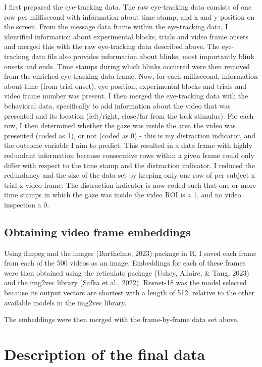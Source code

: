 \documentclass[
  man,floatsintext]{apa6}
\begin{document}
I first prepared the eye-tracking data. The raw eye-tracking data consists of one row per millisecond with information about time stamp, and x and y position on the screen. From the message data frame within the eye-tracking data, I identified information about experimental blocks, trials and video frame onsets and merged this with the raw eye-tracking data described above. The eye-tracking data file also provides information about blinks, most importantly blink onsets and ends. Time stamps during which blinks occurred were then removed from the enriched eye-tracking data frame. Now, for each millisecond, information about time (from trial onset), eye position, experimental blocks and trials and video frame number was present. I then merged the eye-tracking data with the behavioral data, specifically to add information about the video that was presented and its location (left/right, close/far from the task stimulus). For each row, I then determined whether the gaze was inside the area the video was presented (coded as 1), or not (coded as 0) - this is my distraction indicator, and the outcome variable I aim to predict. This resulted in a data frame with highly redundant information because consecutive rows within a given frame could only differ with respect to the time stamp and the distraction indicator. I reduced the redundancy and the size of the data set by keeping only one row of per subject x trial x video frame. The distraction indicator is now coded such that one or more time stamps in which the gaze was inside the video ROI is a 1, and no video inspection a 0.

\hypertarget{obtaining-video-frame-embeddings}{%
\subsection{Obtaining video frame embeddings}\label{obtaining-video-frame-embeddings}}

Using ffmpeg and the imager (Barthelme, 2023) package in R, I saved each frame from each of the 500 videos as an image. Embeddings for each of these frames were then obtained using the reticulate package (Ushey, Allaire, \& Tang, 2023) and the img2vec library (Safka et al., 2022). Resnet-18 was the model selected because its output vectors are shortest with a length of 512, relative to the other available models in the img2vec library.

The embeddings were then merged with the frame-by-frame data set above.

\hypertarget{description-of-the-final-data}{%
\section{Description of the final data}\label{description-of-the-final-data}}
\end{document}
